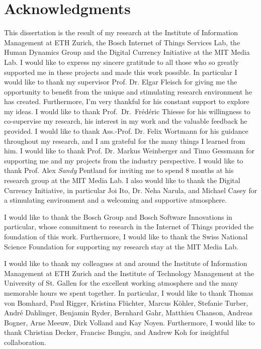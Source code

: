 
\begingroup
\let\clearpage\relax
\let\cleardoublepage\relax
\let\cleardoublepage\relax

\chapter*{Acknowledgments}

This dissertation is the result of my research at the Institute of Information Management at ETH Zurich, the Bosch Internet of Things Services Lab, the Human Dynamics Group and the Digital Currency Initiative at the MIT Media Lab. I would like to express my sincere gratitude to all those who so greatly supported me in these projects and made this work possible.
In particular I would like to thank my supervisor Prof. Dr. Elgar Fleisch for giving me the opportunity to benefit from the unique and stimulating research environment he has created. Furthermore, I'm very thankful for his constant support to explore my ideas. I would like to thank Prof.\ Dr.\ Fr\'{e}d\'{e}ric Thiesse for his willingness to co-supervise my research, his interest in my work and the valuable feedback he provided. I would like to thank Ass.-Prof. Dr. Felix Wortmann for his guidance throughout my research, and I am grateful for the many things I learned from him. I would like to thank Prof. Dr. Markus Weinberger and Timo Gessmann for supporting me and my projects from the industry perspective. I would like to thank Prof. Alex \emph{Sandy} Pentland for inviting me to spend 8 months at his research group at the MIT Media Lab. I also would like to thank the Digital Currency Initiative, in particular Joi Ito, Dr. Neha Narula, and Michael Casey for a stimulating environment and a welcoming and supportive atmosphere. 

I would like to thank the Bosch Group and Bosch Software Innovations in particular, whose commitment to research in the Internet of Things provided the foundation of this work. Furthermore, I would like to thank the Swiss National Science Foundation for supporting my research stay at the MIT Media Lab.

I would like to thank my colleagues at and around the Institute of Information Management at ETH Zurich and the Institute of Technology Management at the University of St. Gallen for the excellent working atmosphere and the many memorable hours we spent together. In particular, I would like to thank Thomas von Bomhard, Paul Rigger, Kristina Fl{\"u}chter, Marcus K{\"o}hler, Stefanie Turber, Andr{\'e} Dahlinger, Benjamin Ryder, Bernhard Gahr, Matthieu Chanson, Andreas Bogner, Arne Meeuw, Dirk Volland and Kay Noyen. Furthermore, I would like to thank Christian Decker, Francisc Bungiu, and Andrew Koh for insightful collaboration.



\endgroup
